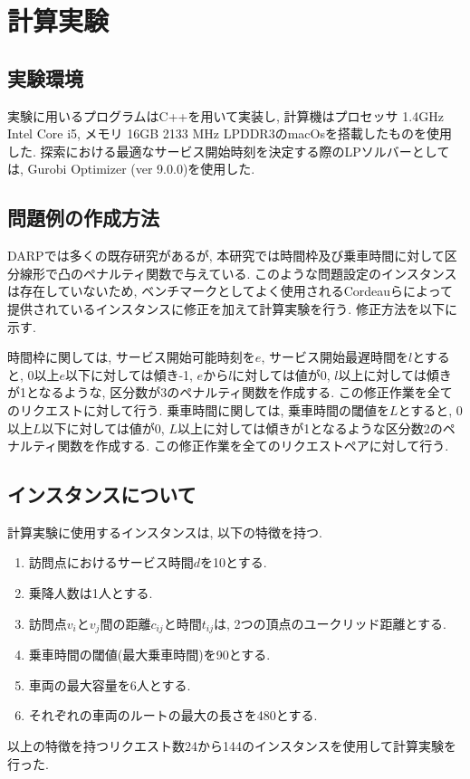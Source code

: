 \chapter{計算実験}\label{computational_result}
\section{実験環境}
実験に用いるプログラムはC++を用いて実装し, 計算機はプロセッサ 1.4GHz Intel Core i5, メモリ 16GB 2133 MHz LPDDR3のmacOsを搭載したものを使用した. 探索における最適なサービス開始時刻を決定する際のLPソルバーとしては, Gurobi Optimizer (ver 9.0.0)を使用した.

\section{問題例の作成方法}
DARPでは多くの既存研究があるが, 本研究では時間枠及び乗車時間に対して区分線形で凸のペナルティ関数で与えている. このような問題設定のインスタンスは存在していないため, ベンチマークとしてよく使用されるCordeauらによって提供されている\cite{tabu}インスタンスに修正を加えて計算実験を行う. 修正方法を以下に示す.

時間枠に関しては, サービス開始可能時刻を$e$, サービス開始最遅時間を$l$とすると, 0以上$e$以下に対しては傾き-1, $e$から$l$に対しては値が0, $l$以上に対しては傾きが1となるような, 区分数が3のペナルティ関数を作成する. この修正作業を全てのリクエストに対して行う. 乗車時間に関しては, 乗車時間の閾値を$L$とすると, 0以上$L$以下に対しては値が0, $L$以上に対しては傾きが1となるような区分数2のペナルティ関数を作成する. この修正作業を全てのリクエストペアに対して行う.
\section{インスタンスについて}
計算実験に使用するインスタンスは, 以下の特徴を持つ.
\begin{enumerate}
 \item 訪問点におけるサービス時間$d$を10とする.
 \item 乗降人数は1人とする.
 \item 訪問点$v_i$と$v_j$間の距離$c_{ij}$と時間$t_{ij}$は, 2つの頂点のユークリッド距離とする.
 \item 乗車時間の閾値(最大乗車時間)を90とする.
 \item 車両の最大容量を6人とする.
 \item それぞれの車両のルートの最大の長さを480とする.
\end{enumerate}
以上の特徴を持つリクエスト数24から144のインスタンスを使用して計算実験を行った.
